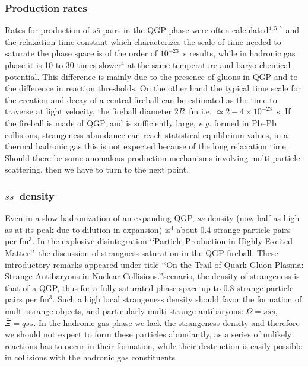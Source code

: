 \begin{mdframed}[linecolor=gray,roundcorner=12pt,backgroundcolor=Dandelion!15,linewidth=1pt,leftmargin=0cm,rightmargin=0cm,topline=true,bottomline=true,skipabove=12pt]
\subsubsection*{Production rates} 
Rates for production of $s\bar s$ pairs in the QGP phase were often calculated$^{4,5,7}$ and the relaxation time constant which characterizes the scale of time needed to saturate the phase space is of the order of $10^{-23}$~s results, while in hadronic gas phase it is 10 to 30 times slower$^{4}$ at the same temperature and baryo-chemical potential. This difference is mainly due to the presence of gluons in QGP and to the difference in reaction thresholds. On the other hand the typical time scale for the creation and decay of a central fireball can be estimated as the time to traverse at light velocity, the fireball diameter $2R$~fm i.e. $\simeq 2-4\times 10^{-23}$~s. If the fireball is made of QGP, and is sufficiently large, \textit{e.g.} formed in Pb--Pb collisions, strangeness abundance can reach statistical equilibrium values, in a thermal hadronic gas this is not expected because of the long relaxation time. Should there be some anomalous production mechanisms involving multi-particle scattering, then we have to turn to the next point.
 
\subsubsection*{$s\bar s$--density}
Even in a slow hadronization of an expanding QGP, $s\bar s$ density (now half as high as at its peak due to dilution in expansion) is$^{4}$ about 0.4 strange particle pairs per fm$^3$. In the explosive disintegration \lq\lq Particle Production in Highly Excited Matter\rq\rq\ the discussion of strangness saturation in the QGP fireball. These introductory remarks appeared under title \lq\lq On the Trail of Quark-Gluon-Plasma: Strange Antibaryons in Nuclear Collisions.\rq\rq scenario, the density of strangeness is that of a QGP, thus for a fully saturated phase space up to 0.8 strange particle pairs per fm$^3$. Such a high local strangeness density should favor the formation of multi-strange objects, and particularly multi-strange antibaryons: $\overline{\Omega}=\bar s\bar s\bar s$, $\overline{\Xi}=\bar q\bar s\bar s$. In the hadronic gas phase we lack the strangeness density and therefore we should not expect to form these particles abundantly, as a series of unlikely reactions has to occur in their formation, while their destruction is easily possible in collisions with the hadronic gas constituents
 

\end{mdframed}
